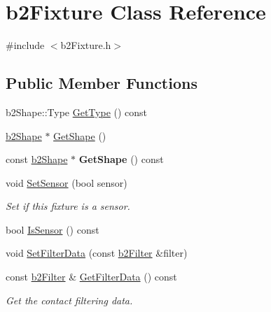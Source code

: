 \hypertarget{classb2Fixture}{}\section{b2\+Fixture Class Reference}
\label{classb2Fixture}


{\ttfamily \#include $<$b2\+Fixture.\+h$>$}

\subsection*{Public Member Functions}
\begin{DoxyCompactItemize}
\item 
b2\+Shape\+::\+Type \mbox{\hyperlink{classb2Fixture_a7a566c1e3b768f6a72ebc3b758aad70e}{Get\+Type}} () const
\item 
\mbox{\hyperlink{classb2Shape}{b2\+Shape}} $\ast$ \mbox{\hyperlink{classb2Fixture_aaa2b73fa212fa53b1c800cccd7a1d31e}{Get\+Shape}} ()
\item 
\mbox{\label{classb2Fixture_a783f8bcb19eee659686284872e70f383}} 
const \mbox{\hyperlink{classb2Shape}{b2\+Shape}} $\ast$ {\bfseries Get\+Shape} () const
\item 
\mbox{\label{classb2Fixture_a6198a81dcee0fe814d730383ebfa7038}} 
void \mbox{\hyperlink{classb2Fixture_a6198a81dcee0fe814d730383ebfa7038}{Set\+Sensor}} (bool sensor)
\begin{DoxyCompactList}\small\item\em Set if this fixture is a sensor. \end{DoxyCompactList}\item 
bool \mbox{\hyperlink{classb2Fixture_aedd23d27ff7ce2d53b6c5b7a878a35d3}{Is\+Sensor}} () const
\item 
void \mbox{\hyperlink{classb2Fixture_a2c5e0d12c174927a4ad550459be334ad}{Set\+Filter\+Data}} (const \mbox{\hyperlink{structb2Filter}{b2\+Filter}} \&filter)
\item 
\mbox{\label{classb2Fixture_ad956250d9f684a407992ec178320127e}} 
const \mbox{\hyperlink{structb2Filter}{b2\+Filter}} \& \mbox{\hyperlink{classb2Fixture_ad956250d9f684a407992ec178320127e}{Get\+Filter\+Data}} () const
\begin{DoxyCompactList}\small\item\em Get the contact filtering data. \end{DoxyCompactList}\item 

\end{DoxyCompactItemize}
